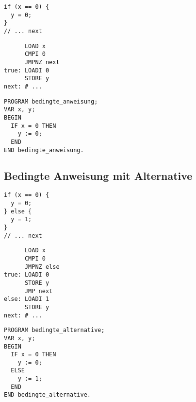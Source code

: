 \documentclass{lehramt-informatik-haupt}
\begin{document}
\begin{multicols}{3}

\begin{verbatim}
if (x == 0) {
  y = 0;
}
// ... next
\end{verbatim}

\liSpaltenUmbruch
{}

\begin{verbatim}
      LOAD x
      CMPI 0
      JMPNZ next
true: LOADI 0
      STORE y
next: # ...
\end{verbatim}

\liSpaltenUmbruch
{}

\begin{verbatim}
PROGRAM bedingte_anweisung;
VAR x, y;
BEGIN
  IF x = 0 THEN
    y := 0;
  END
END bedingte_anweisung.
\end{verbatim}
\vfill\strut
\end{multicols}

%

\subsection{Bedingte Anweisung mit Alternative}

\begin{multicols}{3}


\begin{verbatim}
if (x == 0) {
  y = 0;
} else {
  y = 1;
}
// ... next
\end{verbatim}

\liSpaltenUmbruch


\begin{verbatim}
      LOAD x
      CMPI 0
      JMPNZ else
true: LOADI 0
      STORE y
      JMP next
else: LOADI 1
      STORE y
next: # ...
\end{verbatim}

\liSpaltenUmbruch
{}

\begin{verbatim}
PROGRAM bedingte_alternative;
VAR x, y;
BEGIN
  IF x = 0 THEN
    y := 0;
  ELSE
    y := 1;
  END
END bedingte_alternative.
\end{verbatim}
\vfill\strut
\end{multicols}
\end{document}
